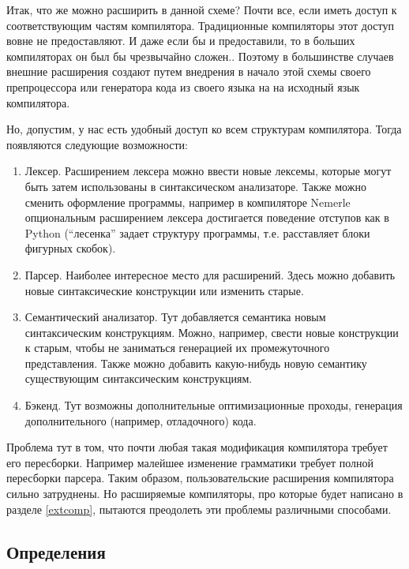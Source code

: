 \documentclass[a4paper,12pt]{article}
\begin{document}
Итак, что же можно расширить в данной схеме? Почти все, если иметь доступ к
соответствующим частям компилятора. Традиционные компиляторы этот доступ вовне
не предоставляют. И даже если бы и предоставили, то в больших компиляторах он
был бы чрезвычайно сложен.. Поэтому в большинстве случаев внешние расширения
создают путем внедрения в начало этой схемы своего препроцессора или генератора
кода из своего языка на на исходный язык компилятора.

Но, допустим, у нас есть удобный доступ ко всем структурам компилятора. Тогда
появляются следующие возможности:

\begin{enumerate}
  \item Лексер. Расширением лексера можно ввести новые лексемы, которые могут
  быть затем использованы в синтаксическом анализаторе. Также можно сменить
  оформление программы, например в компиляторе Nemerle опциональным расширением
  лексера достигается поведение отступов как в Python (``лесенка'' задает
  структуру программы, т.е. расставляет блоки фигурных скобок).
  \item Парсер. Наиболее интересное место для расширений. Здесь можно добавить
  новые синтаксические конструкции или изменить старые.
  \item Семантический анализатор. Тут добавляется семантика новым
  синтаксическим конструкциям. Можно, например, свести новые конструкции к
  старым, чтобы не заниматься генерацией их промежуточного представления.
  Также можно добавить какую-нибудь новую семантику существующим
  синтаксическим конструкциям.
  \item Бэкенд. Тут возможны дополнительные оптимизационные проходы, генерация
  дополнительного (например, отладочного) кода.
\end{enumerate}
Проблема тут в том, что почти любая такая модификация компилятора требует его
пересборки. Например малейшее изменение грамматики требует полной пересборки
парсера. Таким образом, пользовательские расширения компилятора сильно
затруднены. Но расширяемые компиляторы, про которые будет написано в разделе
\ref{extcomp}, пытаются преодолеть эти проблемы различными способами.

\subsection{Определения}
\end{document}
